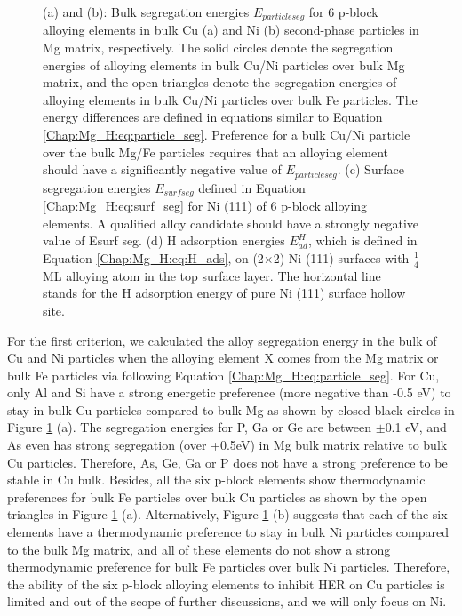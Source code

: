 \begin{figure}[!ht]
\caption[Effects of 6 p-block elements on other precipitates(Cu and Ni)]{(a) and (b): Bulk segregation energies $E_{particle seg}$ for 6 p-block alloying elements in bulk Cu (a) and Ni (b) second-phase particles in Mg matrix, respectively. The solid circles denote the segregation energies of alloying elements in bulk Cu/Ni particles over bulk Mg matrix, and the open triangles denote the segregation energies of alloying elements in bulk Cu/Ni particles over bulk Fe particles. The energy differences are defined in equations similar to Equation \ref{Chap:Mg_H:eq:particle_seg}. Preference for a bulk Cu/Ni particle over the bulk Mg/Fe particles requires that an alloying element should have a significantly negative value of $E_{particle seg}$. (c) Surface segregation energies $E_{surf seg}$ defined in Equation \ref{Chap:Mg_H:eq:surf_seg} for Ni (111) of 6 p-block alloying elements. A qualified alloy candidate should have a strongly negative value of Esurf seg. (d) H adsorption energies $E_{ad}^H$, which is defined in Equation \ref{Chap:Mg_H:eq:H_ads}, on (2$\times$2) Ni (111) surfaces with $\frac{1}{4}$ \ac{ML} alloying atom in the top surface layer. The horizontal line stands for the H adsorption energy of pure Ni (111) surface hollow site.}
  \label{Chap:Mg_H:fig12}
\end{figure}
\endgroup

For the first criterion, we calculated the alloy segregation energy in the bulk of Cu and Ni particles when the alloying element X comes from the Mg matrix or bulk Fe particles via following Equation \ref{Chap:Mg_H:eq:particle_seg}. For Cu, only Al and Si have a strong energetic preference (more negative than -0.5 eV) to stay in bulk Cu particles compared to bulk Mg as shown by closed black circles in Figure \ref{Chap:Mg_H:fig12} (a). The segregation energies for P, Ga or Ge are between $\pm$0.1 eV, and As even has strong segregation (over +0.5eV) in Mg bulk matrix relative to bulk Cu particles.  Therefore, As, Ge, Ga or P does not have a strong preference to be stable in Cu bulk. Besides, all the six p-block elements show thermodynamic preferences for bulk Fe particles over bulk Cu particles as shown by the open triangles in Figure \ref{Chap:Mg_H:fig12} (a). Alternatively, Figure \ref{Chap:Mg_H:fig12} (b) suggests that each of the six elements have a thermodynamic preference to stay in bulk Ni particles compared to the bulk Mg matrix, and all of these elements do not show a strong thermodynamic preference for bulk Fe particles over bulk Ni particles. Therefore, the ability of the six p-block alloying elements to inhibit HER on Cu particles is limited and out of the scope of further discussions, and we will only focus on Ni.


